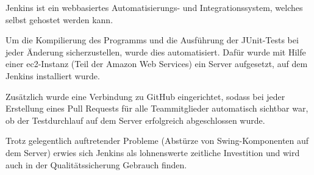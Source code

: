 Jenkins ist ein webbasiertes Automatisierungs- und Integrationssystem, welches selbst gehostet werden kann. 

Um die Kompilierung des Programms und die Ausführung der JUnit-Tests bei jeder Änderung sicherzustellen, wurde dies automatisiert.
Dafür wurde mit Hilfe einer ec2-Instanz (Teil der Amazon Web Services) ein Server aufgesetzt, auf dem Jenkins installiert wurde.

Zusätzlich wurde eine Verbindung zu GitHub eingerichtet, sodass bei jeder Erstellung eines Pull Requests für alle Teammitglieder automatisch sichtbar war, ob der Testdurchlauf auf dem Server erfolgreich abgeschlossen wurde.

Trotz gelegentlich auftretender Probleme (Abstürze von Swing-Komponenten auf dem Server) erwies sich Jenkins als lohnenswerte zeitliche Investition und wird auch in der Qualitätssicherung Gebrauch finden.